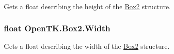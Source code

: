 Gets a float describing the height of the \hyperlink{struct_open_t_k_1_1_box2}{Box2} structure. 

\hypertarget{struct_open_t_k_1_1_box2_a29d85bf58aacaa02bb3869d1b6f0d6a0}{
\subsubsection[{Width}]{\setlength{\rightskip}{0pt plus 5cm}float Open\-T\-K.\-Box2.\-Width\hspace{0.3cm}{\ttfamily [get]}}}\label{struct_open_t_k_1_1_box2_a29d85bf58aacaa02bb3869d1b6f0d6a0}


Gets a float describing the width of the \hyperlink{struct_open_t_k_1_1_box2}{Box2} structure. 

